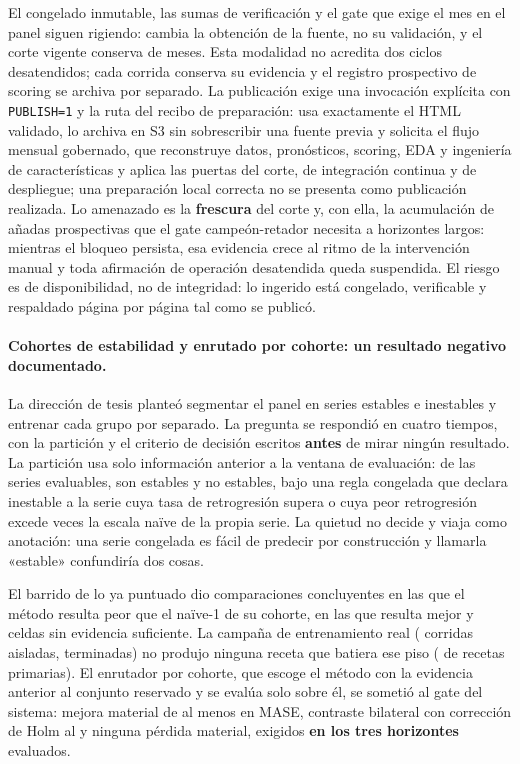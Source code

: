 \documentclass[12pt,letterpaper]{report}
\begin{document}
El congelado inmutable, las sumas de verificación y el gate que exige el mes en el panel siguen
rigiendo: cambia la obtención de la fuente, no su validación, y el corte vigente conserva
\factNMonths{} de \factNMonths{} meses. Esta modalidad no acredita dos ciclos desatendidos; cada
corrida conserva su evidencia y el registro prospectivo de scoring se archiva por separado. La
publicación exige una invocación explícita con \texttt{PUBLISH=1} y la ruta del recibo de
preparación: usa exactamente el HTML validado, lo archiva en S3 sin sobrescribir una fuente
previa y solicita el flujo mensual gobernado, que reconstruye datos, pronósticos, scoring, EDA y
ingeniería de características y aplica las puertas del corte, de integración continua y de despliegue; una preparación local correcta no se
presenta como publicación realizada. Lo amenazado es la \textbf{frescura} del corte y, con ella,
la acumulación de añadas prospectivas que el gate campeón-retador necesita a horizontes largos:
mientras el bloqueo persista, esa evidencia crece al ritmo de la intervención manual y toda
afirmación de operación desatendida queda suspendida. El riesgo es de disponibilidad, no de
integridad: lo ingerido está congelado, verificable y respaldado página por página tal como se
publicó.

\paragraph{Cohortes de estabilidad y enrutado por cohorte: un resultado negativo documentado.}
La dirección de tesis planteó segmentar el panel en series estables e inestables y entrenar cada
grupo por separado. La pregunta se respondió en cuatro tiempos, con la partición y el criterio
de decisión escritos \textbf{antes} de mirar ningún resultado. La partición usa solo información
anterior a la ventana de evaluación: de las \cohortFactNSeriesEvaluable{} series evaluables,
\cohortFactNEstable{} son estables y \cohortFactNNoEstable{} no estables, bajo una regla
congelada que declara inestable a la serie cuya tasa de retrogresión supera
\cohortFactRetroRateMax{} o cuya peor retrogresión excede \cohortFactWorstRetroScaledMax{} veces
la escala naïve de la propia serie. La quietud no decide y viaja como anotación: una serie
congelada es fácil de predecir por construcción y llamarla «estable» confundiría dos cosas.

El barrido de lo ya puntuado dio \cohortFactScanPeor{} comparaciones concluyentes en las que el
método resulta peor que el naïve-1 de su cohorte, \cohortFactScanBate{} en las que resulta mejor
y \cohortFactScanSinDatos{} celdas sin evidencia suficiente. La campaña de entrenamiento real
(\cohortFactCampanaLanes{} corridas aisladas, \cohortFactCampanaOk{} terminadas) no produjo
ninguna receta que batiera ese piso (\cohortFactCampanaBate{} de \cohortFactCampanaPrimarias{}
recetas primarias). El enrutador por cohorte, que escoge el método con la evidencia anterior al
conjunto reservado y se evalúa solo sobre él, se sometió al gate del sistema: mejora material de
al menos \cohortFactRouterMargen{} en MASE, contraste bilateral con corrección de Holm al
\cohortFactRouterAlfa{} y ninguna pérdida material, exigidos \textbf{en los tres horizontes}
evaluados.
\end{document}
